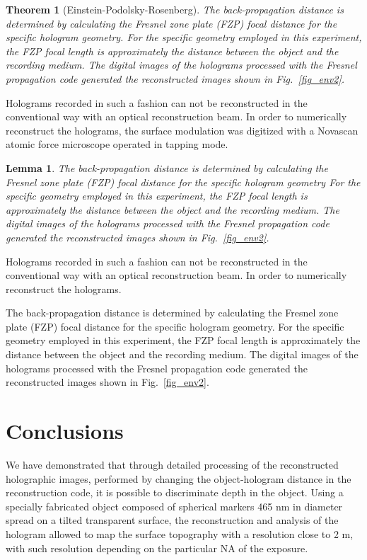 \documentclass[]{IEEEphot}
\newtheorem{theorem}{Theorem}
\newtheorem{lemma}{Lemma}
\begin{document}
\begin{theorem}[Einstein-Podolsky-Rosenberg]
The back-propagation distance is determined by calculating the Fresnel zone plate (FZP) focal distance for the specific hologram geometry. For the specific geometry employed in this experiment, the FZP focal length is approximately the distance between the object and the recording medium. The digital images of the holograms processed with the Fresnel propagation code generated the reconstructed images shown in Fig.~\ref{fig_env2}.    
\end{theorem}

Holograms recorded in such a fashion can not be reconstructed in the conventional way with an optical reconstruction beam. In order to numerically reconstruct the holograms, the surface modulation was digitized with a Novascan atomic force microscope operated in tapping mode. 

\begin{lemma}
The back-propagation distance is determined by calculating the Fresnel zone plate (FZP) focal distance for the specific hologram geometry  For the specific geometry employed in this experiment, the FZP focal length is approximately the distance between the object and the recording medium. The digital images of the holograms processed with the Fresnel propagation code generated the reconstructed images shown in Fig.~\ref{fig_env2}.    
\end{lemma}

Holograms recorded in such a fashion can not be reconstructed in the conventional way with an optical reconstruction beam. In order to numerically reconstruct the holograms. 

\begin{IEEEproof}%
The back-propagation distance is determined by calculating the Fresnel zone plate (FZP) focal distance for the specific hologram geometry. For the specific geometry employed in this experiment, the FZP focal length is approximately the distance between the object and the recording medium. The digital images of the holograms processed with the Fresnel propagation code generated the reconstructed images shown in Fig.~\ref{fig_env2}.    
\end{IEEEproof}

\section{Conclusions}
 We have demonstrated that through detailed processing of the reconstructed holographic images, performed by changing the object-hologram distance in the reconstruction code, it is possible to discriminate depth in the object. Using a specially fabricated object composed of spherical markers 465 nm in diameter spread on a tilted transparent surface, the reconstruction and analysis of the hologram allowed to map the surface topography with a resolution close to 2 m, with such resolution depending on the particular NA of the exposure. 
\end{document}
